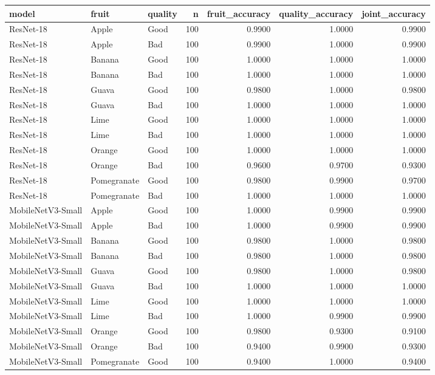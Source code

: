 \begin{tabular}{lllrrrr}
\toprule
model & fruit & quality & n & fruit_accuracy & quality_accuracy & joint_accuracy \\
\midrule
ResNet-18 & Apple & Good & 100 & 0.9900 & 1.0000 & 0.9900 \\
ResNet-18 & Apple & Bad & 100 & 0.9900 & 1.0000 & 0.9900 \\
ResNet-18 & Banana & Good & 100 & 1.0000 & 1.0000 & 1.0000 \\
ResNet-18 & Banana & Bad & 100 & 1.0000 & 1.0000 & 1.0000 \\
ResNet-18 & Guava & Good & 100 & 0.9800 & 1.0000 & 0.9800 \\
ResNet-18 & Guava & Bad & 100 & 1.0000 & 1.0000 & 1.0000 \\
ResNet-18 & Lime & Good & 100 & 1.0000 & 1.0000 & 1.0000 \\
ResNet-18 & Lime & Bad & 100 & 1.0000 & 1.0000 & 1.0000 \\
ResNet-18 & Orange & Good & 100 & 1.0000 & 1.0000 & 1.0000 \\
ResNet-18 & Orange & Bad & 100 & 0.9600 & 0.9700 & 0.9300 \\
ResNet-18 & Pomegranate & Good & 100 & 0.9800 & 0.9900 & 0.9700 \\
ResNet-18 & Pomegranate & Bad & 100 & 1.0000 & 1.0000 & 1.0000 \\
MobileNetV3-Small & Apple & Good & 100 & 1.0000 & 0.9900 & 0.9900 \\
MobileNetV3-Small & Apple & Bad & 100 & 1.0000 & 0.9900 & 0.9900 \\
MobileNetV3-Small & Banana & Good & 100 & 0.9800 & 1.0000 & 0.9800 \\
MobileNetV3-Small & Banana & Bad & 100 & 0.9800 & 1.0000 & 0.9800 \\
MobileNetV3-Small & Guava & Good & 100 & 0.9800 & 1.0000 & 0.9800 \\
MobileNetV3-Small & Guava & Bad & 100 & 1.0000 & 1.0000 & 1.0000 \\
MobileNetV3-Small & Lime & Good & 100 & 1.0000 & 1.0000 & 1.0000 \\
MobileNetV3-Small & Lime & Bad & 100 & 1.0000 & 0.9900 & 0.9900 \\
MobileNetV3-Small & Orange & Good & 100 & 0.9800 & 0.9300 & 0.9100 \\
MobileNetV3-Small & Orange & Bad & 100 & 0.9400 & 0.9900 & 0.9300 \\
MobileNetV3-Small & Pomegranate & Good & 100 & 0.9400 & 1.0000 & 0.9400 \\

\end{tabular}
